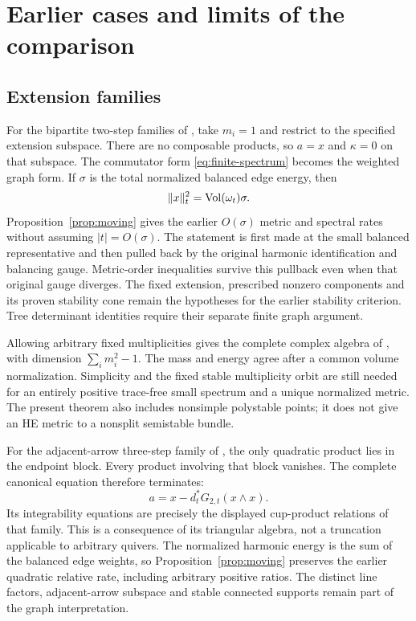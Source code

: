 \section{Earlier cases and limits of the comparison}\label{sec:recovery}

\subsection{Extension families}
For the bipartite two-step families of
\cite[Theorem~1.1]{wuebben1}, take $m_i=1$ and restrict to the
specified extension subspace. There are no composable products,
so $a=x$ and $\kappa=0$ on that subspace. The commutator form
\eqref{eq:finite-spectrum} becomes the weighted graph form.
If $\sigma$ is the total normalized balanced edge energy, then
\[
 \|x\|_t^2=\operatorname{Vol}(\omega_t)\sigma .
\]
Proposition~\ref{prop:moving} gives the earlier $O(\sigma)$
metric and spectral rates without assuming $|t|=O(\sigma)$.
The statement is first made at the small balanced representative
and then pulled back by the original harmonic identification and
balancing gauge. Metric-order inequalities survive this pullback
even when that original gauge diverges. The fixed extension,
prescribed nonzero components and its proven stability cone
remain the hypotheses for the earlier stability criterion.
Tree determinant identities require their separate finite
graph argument.

Allowing arbitrary fixed multiplicities gives the complete
complex algebra of \cite[Theorem~1.1 and Section~5]{wuebben4},
with dimension $\sum_i m_i^2-1$. The mass and energy agree after
a common volume normalization. Simplicity and the fixed stable
multiplicity orbit are still needed for an entirely positive
trace-free small spectrum and a unique normalized metric.
The present theorem also includes nonsimple polystable points;
it does not give an HE metric to a nonsplit semistable bundle.

For the adjacent-arrow three-step family of
\cite[Section~3]{wuebben5}, the only quadratic product lies in
the endpoint block. Every product involving that block vanishes.
The complete canonical equation therefore terminates:
\[
 a=x-d_t^*G_{2,t}(x\wedge x).
\]
Its integrability equations are precisely the displayed cup-product
relations of that family. This is a consequence of its triangular
algebra, not a truncation applicable to arbitrary quivers.
The normalized harmonic energy is the sum of the balanced edge
weights, so Proposition~\ref{prop:moving} preserves the earlier
quadratic relative rate, including arbitrary positive ratios.
The distinct line factors, adjacent-arrow subspace and stable
connected supports remain part of the graph interpretation.

